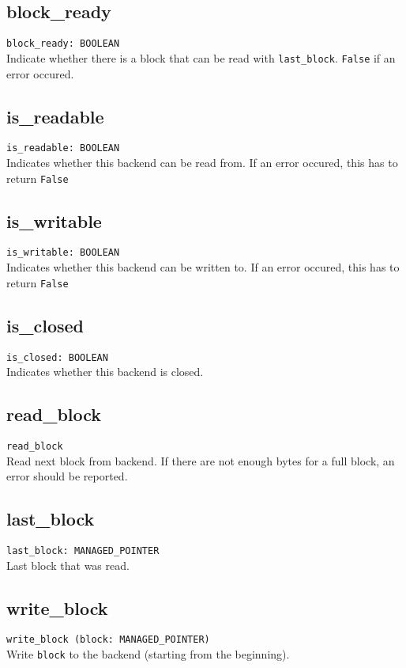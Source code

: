 \subsection{block\_ready}
\lstinline;block_ready: BOOLEAN;\\
Indicate whether there is a block that can be read with \lstinline;last_block;.
\lstinline;False; if an error occured.


\subsection{is\_readable}
\lstinline;is_readable: BOOLEAN;\\
Indicates whether this backend can be read from. If an error occured, this has
to return \lstinline;False;

\subsection{is\_writable}
\lstinline;is_writable: BOOLEAN;\\
Indicates whether this backend can be written to. If an error occured, this has
to return \lstinline;False;

\subsection{is\_closed}
\lstinline;is_closed: BOOLEAN;\\
Indicates whether this backend is closed.

\subsection{read\_block}
\lstinline;read_block;\\
Read next block from backend. If there are not enough bytes for a full block, an
error should be reported.

\subsection{last\_block}
\lstinline;last_block: MANAGED_POINTER;\\
Last block that was read.

\subsection{write\_block}
\lstinline;write_block (block: MANAGED_POINTER);\\
Write \lstinline;block; to the backend (starting from the beginning).

